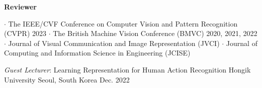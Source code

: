 



\textbf{Reviewer}
\begin{cvskills}
\cvskill
{} %
{\hspace{-3em} \textbf{$\cdot$} The IEEE/CVF Conference on Computer Vision and Pattern Recognition (CVPR) 2023}
\cvskill
{} %
{\hspace{-3em} \textbf{$\cdot$} The British Machine Vision Conference (BMVC) 2020, 2021, 2022}
\cvskill
{} %
{\hspace{-3em} \textbf{$\cdot$} Journal of Visual Communication and Image Representation (JVCI)}
\cvskill
{}
{\hspace{-3em} \textbf{$\cdot$} Journal of Computing and Information Science in Engineering (JCISE)}

\end{cvskills}


\vspace{.5em}

\cventry
{\textit{Guest Lecturer}: Learning Representation for Human Action Recognition}
{Hongik University}
{Seoul, South Korea}
{Dec. 2022}
{}
